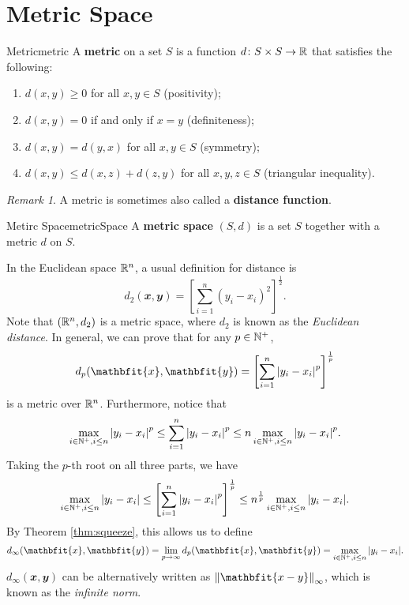 \documentclass[math]{amznotes}
\theoremstyle{remark}
\newtheorem*{remark}{Remark}
\begin{document}
\section{Metric Space}
\begin{dfnbox}{Metric}{metric}
    A {\color{red} \textbf{metric}} on a set $S$ is a function $d \colon S \times S \to \mathbb{R}$ that satisfies the following:
    \begin{enumerate}
        \item $d(x, y) \geq 0$ for all $x, y \in S$ (positivity);
        \item $d(x, y) = 0$ if and only if $x = y$ (definiteness);
        \item $d(x, y) = d(y, x)$ for all $x, y \in S$ (symmetry);
        \item $d(x, y) \leq d(x, z) + d(z, y)$ for all $x, y, z \in S$ (triangular inequality).
    \end{enumerate}
\end{dfnbox}
\begin{notebox}
    \begin{remark}
        A metric is sometimes also called a {\color{red} \textbf{distance function}}.
    \end{remark}
\end{notebox}
\begin{dfnbox}{Metirc Space}{metricSpace}
    A {\color{red} \textbf{metric space}} $(S, d)$ is a set $S$ together with a metric $d$ on $S$.    
\end{dfnbox}
In the Euclidean space $\mathbb{R}^n$, a usual definition for distance is
\begin{equation*}
    d_2(\mathbfit{x}, \mathbfit{y}) = \left[\sum_{i = 1}^{n}(y_i - x_i)^2\right]^{\frac{1}{2}}.
\end{equation*}
Note that $(\mathbb{R}^n, d_2)$ is a metric space, where $d_2$ is known as the \textit{Euclidean distance}. In general, we can prove that for any $p \in \mathbb{N}^+$,
\begin{equation*}
    d_p(\mathbfit{x}, \mathbfit{y}) = \left[\sum_{i = 1}^{n}\abs{y_i - x_i}^p\right]^{\frac{1}{p}}
\end{equation*}
is a metric over $\mathbb{R}^n$. Furthermore, notice that
\begin{equation*}
    \max_{i \in \mathbb{N}^+, i \leq n}{\left\lvert {y_i - x_i} \right\rvert}^p \leq \sum_{i = 1}^{n}{\left\lvert {y_i - x_i} \right\rvert}^p \leq n\max_{i \in \mathbb{N}^+, i \leq n}{\left\lvert {y_i - x_i} \right\rvert}^p.
\end{equation*}
Taking the $p$-th root on all three parts, we have
\begin{equation*}
    \max_{i \in \mathbb{N}^+, i \leq n}{\left\lvert {y_i - x_i} \right\rvert} \leq \left[\sum_{i = 1}^{n}{\left\lvert {y_i - x_i} \right\rvert}^p\right]^{\frac{1}{p}} \leq n^{\frac{1}{p}}\max_{i \in \mathbb{N}^+, i \leq n}{\left\lvert {y_i - x_i} \right\rvert}.
\end{equation*}
By Theorem \ref{thm:squeeze}, this allows us to define
\begin{equation*}
    d_\infty(\mathbfit{x}, \mathbfit{y}) = \lim_{p \to \infty}d_p(\mathbfit{x}, \mathbfit{y}) = \max_{i \in \N^+, i \leq n}\abs{y_i - x_i}.
\end{equation*}
$d_\infty(\mathbfit{x}, \mathbfit{y})$ can be alternatively written as $\norm{\mathbfit{x - y}}_\infty$, which is known as the \textit{infinite norm}.
\end{document}

